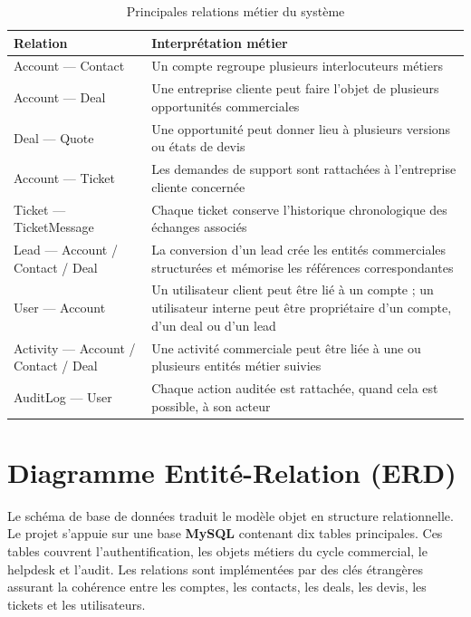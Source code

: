 \begin{table}[H]
\centering
\caption{Principales relations métier du système}
\label{tab:relations_classes}
\begin{tabularx}{\textwidth}{|l|X|}
\hline
\textbf{Relation} & \textbf{Interprétation métier} \\
\hline
Account --- Contact & Un compte regroupe plusieurs interlocuteurs métiers \\
\hline
Account --- Deal & Une entreprise cliente peut faire l'objet de plusieurs opportunités commerciales \\
\hline
Deal --- Quote & Une opportunité peut donner lieu à plusieurs versions ou états de devis \\
\hline
Account --- Ticket & Les demandes de support sont rattachées à l'entreprise cliente concernée \\
\hline
Ticket --- TicketMessage & Chaque ticket conserve l'historique chronologique des échanges associés \\
\hline
Lead --- Account / Contact / Deal & La conversion d'un lead crée les entités commerciales structurées et mémorise les références correspondantes \\
\hline
User --- Account & Un utilisateur client peut être lié à un compte ; un utilisateur interne peut être propriétaire d'un compte, d'un deal ou d'un lead \\
\hline
Activity --- Account / Contact / Deal & Une activité commerciale peut être liée à une ou plusieurs entités métier suivies \\
\hline
AuditLog --- User & Chaque action auditée est rattachée, quand cela est possible, à son acteur \\
\hline
\end{tabularx}
\end{table}

\section{Diagramme Entité-Relation (ERD)}
Le schéma de base de données traduit le modèle objet en structure relationnelle. Le projet s'appuie sur une base \textbf{MySQL} contenant dix tables principales. Ces tables couvrent l'authentification, les objets métiers du cycle commercial, le helpdesk et l'audit. Les relations sont implémentées par des clés étrangères assurant la cohérence entre les comptes, les contacts, les deals, les devis, les tickets et les utilisateurs.\par
\vspace{0.3cm}

